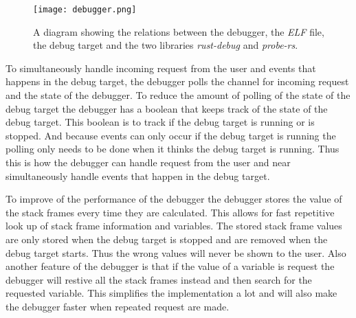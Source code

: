\begin{figure}[h]
	\centering
	\texttt{[image: debugger.png]}
	\caption{A diagram showing the relations between the debugger, the \emph{ELF} file, the debug target and the two libraries \emph{rust-debug} and \emph{probe-rs}.}
	\label{fig:debugger}
\end{figure}


To simultaneously handle incoming request from the user and events that happens in the debug target, the debugger polls the channel for incoming request and the state of the debugger.
To reduce the amount of polling of the state of the debug target the debugger has a boolean that keeps track of the state of the debug target.
This boolean is to track if the debug target is running or is stopped.
And because events can only occur if the debug target is running the polling only needs to be done when it thinks the debug target is running.
Thus this is how the debugger can handle request from the user and near simultaneously handle events that happen in the debug target.


To improve of the performance of the debugger the debugger stores the value of the stack frames every time they are calculated.
This allows for fast repetitive look up of stack frame information and variables.
The stored stack frame values are only stored when the debug target is stopped and are removed when the debug target starts.
Thus the wrong values will never be shown to the user.
Also another feature of the debugger is that if the value of a variable is request the debugger will restive all the stack frames instead and then search for the requested variable.
This simplifies the implementation a lot and will also make the debugger faster when repeated request are made.

